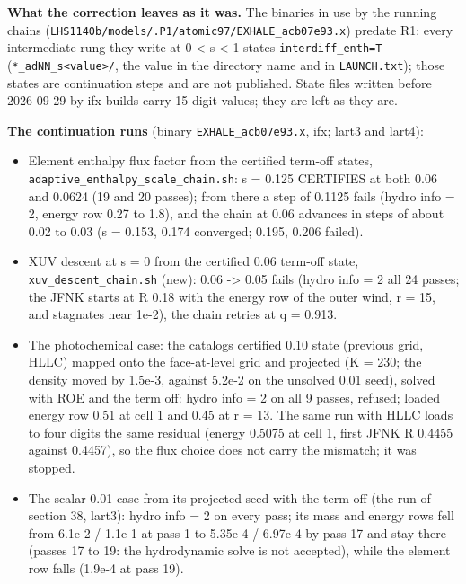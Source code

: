 \documentclass[english,a4paper]{my_memo}
\providecommand{\tightlist}{\setlength{\itemsep}{0pt}\setlength{\parskip}{0pt}}
\begin{document}
\textbf{What the correction leaves as it was.} The binaries in use by the running
chains (\texttt{LHS1140b/models/.P1/atomic97/EXHALE\_acb07e93.x}) predate R1: every
intermediate rung they write at 0 \textless{} s \textless{} 1 states \texttt{interdiff\_enth=T}
(\texttt{*\_adNN\_s\textless{}value\textgreater{}/}, the value in the directory name and in \texttt{LAUNCH.txt});
those states are continuation steps and are not published. State files
written before 2026-09-29 by ifx builds carry 15-digit values; they are
left as they are.

\textbf{The continuation runs} (binary \texttt{EXHALE\_acb07e93.x}, ifx; lart3 and
lart4):

\begin{itemize}
\tightlist
\item
  Element enthalpy flux factor from the certified term-off states,
  \texttt{adaptive\_enthalpy\_scale\_chain.sh}: s = 0.125 CERTIFIES at both 0.06 and
  0.0624 (19 and 20 passes); from there a step of 0.1125 fails (hydro
  info = 2, energy row 0.27 to 1.8), and the chain at 0.06 advances in steps
  of about 0.02 to 0.03 (s = 0.153, 0.174 converged; 0.195, 0.206 failed).
\item
  XUV descent at s = 0 from the certified 0.06 term-off state,
  \texttt{xuv\_descent\_chain.sh} (new): 0.06 -\textgreater{} 0.05 fails (hydro info = 2 all 24
  passes; the JFNK starts at \textbar\textbar R\textbar\textbar{} 0.18 with the energy row of the outer
  wind, r = 15, and stagnates near 1e-2), the chain retries at q = 0.913.
\item
  The photochemical case: the catalog\textquotesingle s certified 0.10 state (previous
  grid, HLLC) mapped onto the face-at-level grid and projected (K = 230;
  the density moved by 1.5e-3, against 5.2e-2 on the unsolved 0.01 seed),
  solved with ROE and the term off: hydro info = 2 on all 9 passes, refused;
  loaded energy row 0.51 at cell 1 and 0.45 at r = 13. The same run with
  HLLC loads to four digits the same residual (energy 0.5075 at cell 1,
  first JFNK \textbar\textbar R\textbar\textbar{} 0.4455 against 0.4457), so the flux choice does not carry
  the mismatch; it was stopped.
\item
  The scalar 0.01 case from its projected seed with the term off (the run
  of section 38, lart3): hydro info = 2 on every pass; its mass and energy
  rows fell from 6.1e-2 / 1.1e-1 at pass 1 to 5.35e-4 / 6.97e-4 by pass 17
  and stay there (passes 17 to 19: the hydrodynamic solve is not accepted),
  while the element row falls (1.9e-4 at pass 19).
\end{itemize}
\end{document}
